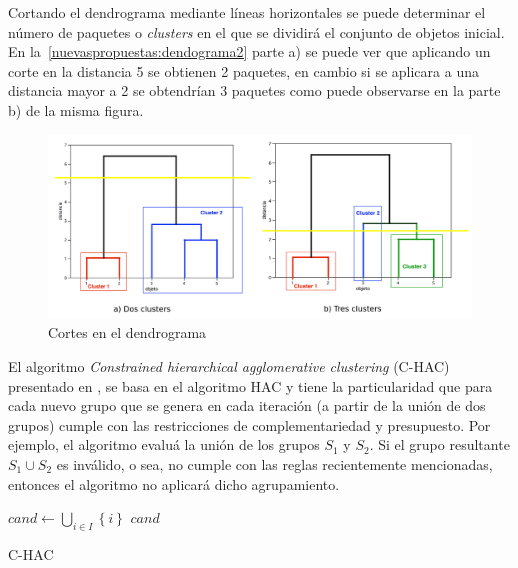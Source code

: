 Cortando el dendrograma mediante líneas horizontales se puede determinar el número de paquetes o \emph{clusters} en el que se dividirá el conjunto de objetos inicial. En la~\autoref{nuevaspropuestas:dendograma2} parte a) se puede ver que aplicando un corte en la distancia 5 se obtienen 2 paquetes, en cambio si se aplicara a una distancia mayor a 2 se obtendrían 3 paquetes como puede observarse en la parte b) de la misma figura.

\begin{figure}[H]
  \centering
    \includegraphics[width=1\textwidth]{img/dendograma02.png}
  \caption{Cortes en el dendrograma}
  \label{nuevaspropuestas:dendograma2}
\end{figure}

El algoritmo \textit{Constrained hierarchical agglomerative clustering} (C-HAC) presentado en \cite{journals/tkde/Amer-YahiaBCFMZ14}, se basa en el algoritmo HAC y tiene la particularidad que para cada nuevo grupo que se genera en cada iteración (a partir de la unión de dos grupos) cumple con las restricciones de complementariedad y presupuesto. Por ejemplo, el algoritmo evaluá la unión de los grupos $S_1$ y $S_2$. Si el grupo resultante $S_1 \cup S_2$ es inválido, o sea, no cumple con las reglas recientemente mencionadas, entonces el algoritmo no aplicará dicho agrupamiento.

\begin{center}
	\begin{algorithm}[H]
	\DontPrintSemicolon
	\SetAlgoLined
		$cand \leftarrow \bigcup_{i \in I}\left\{i\right\}$\; \label{alg:C-HAC:init}
		\Return $cand$\;
	\caption{C-HAC}\label{alg:C-HAC}
	\end{algorithm}
\end{center}

